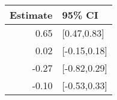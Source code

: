 \begin{tabular}{rl}
  \hline
Estimate & 95\% CI \\ 
  \hline
0.65 & [0.47,0.83] \\ 
  0.02 & [-0.15,0.18] \\ 
  -0.27 & [-0.82,0.29] \\ 
  -0.10 & [-0.53,0.33] \\ 
   \hline
\end{tabular}


